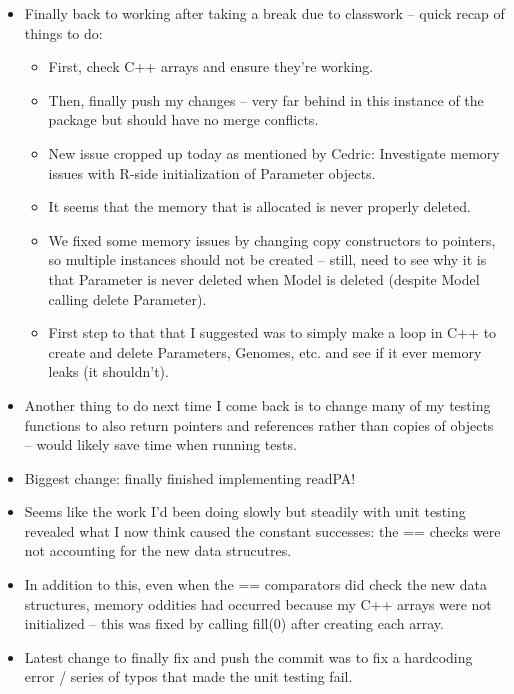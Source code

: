 \documentclass[12pt,hyperref]{labbook}
\begin{document}
\begin{itemize}
    \item Finally back to working after taking a break due to classwork -- quick recap of things to do:
    \begin{itemize}
        \item First, check C++ arrays and ensure they're working.
        \item Then, finally push my changes -- very far behind in this instance of the package but should have no merge conflicts.
        \item New issue cropped up today as mentioned by Cedric: Investigate memory issues with R-side initialization of Parameter objects.
        \item It seems that the memory that is allocated is never properly deleted.
        \item We fixed some memory issues by changing copy constructors to pointers, so multiple instances should not be created -- still, need to see why it is that Parameter is never deleted when Model is deleted (despite Model calling delete Parameter).
        \item First step to that that I suggested was to simply make a loop in C++ to create and delete Parameters, Genomes, etc. and see if it ever memory leaks (it shouldn't).
    \end{itemize}
    \item Another thing to do next time I come back is to change many of my testing functions to also return pointers and references rather than copies of objects -- would likely save time when running tests.
    \item Biggest change: finally finished implementing readPA!
    \item Seems like the work I'd been doing slowly but steadily with unit testing revealed what I now think caused the constant successes: the == checks were not accounting for the new data strucutres.
    \item In addition to this, even when the == comparators did check the new data structures, memory oddities had occurred because my C++ arrays were not initialized -- this was fixed by calling fill(0) after creating each array.
    \item Latest change to finally fix and push the commit was to fix a hardcoding error / series of typos that made the unit testing fail.
\end{itemize}

\end{document}
